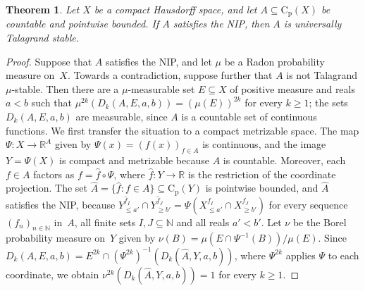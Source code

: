 \documentclass[psamsfonts]{amsart}
\newtheorem{thm}{Theorem}[section]
\theoremstyle{definition}
\theoremstyle{remark}
\newcommand{\Cp}{\mathrm{C}_{\mathrm{p}}}
\numberwithin{equation}{section}
\begin{document}
\begin{thm}\label{thm:NIP-Talagrand-countable}
Let $X$ be a compact Hausdorff space, and let $A\subseteq\Cp(X)$ be countable and pointwise bounded.
If $A$ satisfies the NIP, then $A$ is universally Talagrand stable.
\end{thm}

\begin{proof}
Suppose that $A$ satisfies the NIP, and let $\mu$ be a Radon probability measure on~$X$.
Towards a contradiction, suppose further that $A$ is not Talagrand $\mu$-stable.
Then there are a $\mu$-measurable set $E\subseteq X$ of positive measure and reals $a<b$ such that $\mu^{2k}(D_k(A,E,a,b))=(\mu(E))^{2k}$ for every $k\ge1$; the sets $D_k(A,E,a,b)$ are measurable, since $A$ is a countable set of continuous functions.
We first transfer the situation to a compact metrizable space.
The map $\Psi\colon X\to\mathbb{R}^A$ given by $\Psi(x)=(f(x))_{f\in A}$ is continuous, and the image $Y=\Psi(X)$ is compact and metrizable because $A$ is countable.
Moreover, each $f\in A$ factors as $f=\hat f\circ\Psi$, where $\hat f\colon Y\to\mathbb{R}$ is the restriction of the coordinate projection.
The set $\hat A=\{\hat f:f\in A\}\subseteq\Cp(Y)$ is pointwise bounded, and $\hat A$ satisfies the NIP, because $Y^{\hat f_I}_{\le a'}\cap Y^{\hat f_J}_{\ge b'}=\Psi(X^{f_I}_{\le a'}\cap X^{f_J}_{\ge b'})$ for every sequence $(f_n)_{n\in\mathbb{N}}$ in~$A$, all finite sets $I,J\subseteq\mathbb{N}$ and all reals $a'<b'$.
Let $\nu$ be the Borel probability measure on~$Y$ given by $\nu(B)=\mu(E\cap\Psi^{-1}(B))/\mu(E)$.
Since $D_k(A,E,a,b)=E^{2k}\cap(\Psi^{2k})^{-1}(D_k(\hat A,Y,a,b))$, where $\Psi^{2k}$ applies $\Psi$ to each coordinate, we obtain $\nu^{2k}(D_k(\hat A,Y,a,b))=1$ for every $k\ge1$.


\end{proof}
\end{document}
